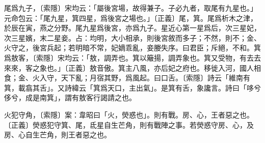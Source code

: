 尾爲九子，〔索隱〕宋均云：「屬後宮場，故得兼子。子必九者，取尾有九星也。」元命包云：「尾九星，箕四星，爲後宮之場也。」〔正義〕尾，箕。尾爲析木之津，於辰在寅，燕之分野。尾九星爲後宮，亦爲九子。星近心第一星爲后，次三星妃，次三星嬪，末二星妾。占：均明，大小相承，則後宮敘而多子；不然，則不；金、火守之，後宮兵起；若明暗不常，妃嫡乖亂，妾媵失序。曰君臣；斥絕，不和。箕爲敖客，〔索隱〕宋均云：「敖，調弄也。箕以簸揚，調弄象也。箕又受物，有去去來來，客之象也。」〔正義〕敖音傲。箕主八風，亦后妃之府也。移徙入河，國人相食；金、火入守，天下亂；月宿其野，爲風起。曰口舌。〔索隱〕詩云「維南有箕，載翕其舌」。又詩緯云「箕爲天口，主出氣」。是箕有舌，象讒言。詩曰「哆兮侈兮，成是南箕」，謂有敖客行謁請之也。

火犯守角，〔索隱〕案：韋昭曰「火，熒惑也」。則有戰。房、心，王者惡之也。〔正義〕熒惑犯守箕、尾，氐星自生芒角，則有戰陣之事。若熒惑守房、心，及房、心自生芒角，則王者惡之也。

